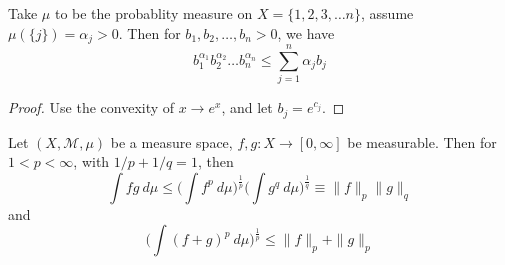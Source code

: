 \begin{example}
  Take $\mu$ to be the probablity measure on $X = \{ 1, 2, 3, \ldots
  n \}$, assume $\mu(\{ j \})= \alpha_j> 0$. Then for $b_1 , b_2 ,
  \ldots , b_n > 0$, we have \[
    b_1^{\alpha_1}b_2^{\alpha_2}\ldots b_n^{\alpha_n} \le \sum_{j =
    1}^{n} \alpha_jb_j
  \]
\end{example}
\begin{proof}
  Use the convexity of $x \to e^x$, and let $ b_j = e^{c_j}$.
\end{proof}

\begin{theorem}
  Let $(X, \mathcal{M},  \mu)$ be a measure space, $f, g : X \to [0,
  \infty]$ be measurable. Then for $1 < p < \infty$, with $1/p + 1/q
  = 1$, then \[
    \int  fg \ d \mu \le \Bigg(\int  f^p \ d \mu \Bigg)^{\frac{1}{p}}
    \Bigg(\int  g^q \ d \mu\Bigg)^{\frac{1}{q}} \equiv \| f\|_p \|g\|_q
  \]
  and \[
    \Bigg(\int(f+g)^p \ d \mu\Bigg)^{\frac{1}{p}} \le \|f\|_p + \|g\|_p
  \]
\end{theorem}


